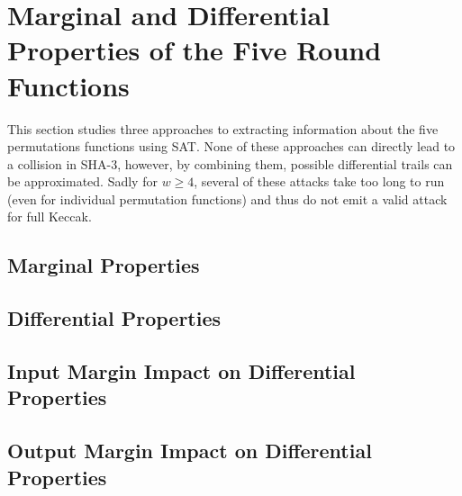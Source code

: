 \documentclass[10pt,twocolumn,twoside]{pnas-new}
\begin{document}




\section{Marginal and Differential Properties of the Five Round Functions} \label{sec:differentials}

This section studies three approaches to extracting information about the five
permutations functions using SAT. None of these approaches can directly lead
to a collision in SHA-3, however, by combining them, possible differential
trails can be approximated. Sadly for $w \geq 4$, several of these attacks take
too long to run (even for individual permutation functions) and thus do not
emit a valid attack for full Keccak.


\subsection{Marginal Properties} \label{sec:d:margin}




\subsection{Differential Properties} \label{sec:d:diff}


\subsection{Input Margin Impact on Differential Properties} \label{sec:d:input}


\subsection{Output Margin Impact on Differential Properties} \label{sec:d:output}
\end{document}
